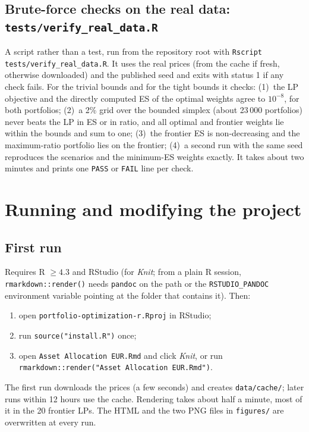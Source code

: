 \documentclass[11pt,a4paper]{article}
\newcommand{\code}[1]{\texttt{#1}}
\newcommand{\file}[1]{\texttt{#1}}
\theoremstyle{plain}
\theoremstyle{remark}
\begin{document}
\subsection{Brute-force checks on the real data: \file{tests/verify\_real\_data.R}}

A script rather than a test, run from the repository root with
\code{Rscript tests/verify\_real\_data.R}. It uses the real prices (from the
cache if fresh, otherwise downloaded) and the published seed and exits with status 1 if any check fails. For the
trivial bounds and for the tight bounds it checks: (1)~the LP objective and
the directly computed ES of the optimal weights agree to $10^{-8}$, for both
portfolios; (2)~a 2\% grid over the bounded simplex (about 23\,000
portfolios) never beats the LP in ES or in ratio, and all optimal and
frontier weights lie within the bounds and sum to one; (3)~the frontier ES
is non-decreasing and the maximum-ratio portfolio lies on the frontier;
(4)~a second run with the same seed reproduces the scenarios and the
minimum-ES weights exactly. It takes about two minutes and prints one \code{PASS} or
\code{FAIL} line per check.

\section{Running and modifying the project}
\label{sec:running}

\subsection{First run}

Requires R $\ge 4.3$ and RStudio (for \emph{Knit}; from a plain R session,
\code{rmarkdown::render()} needs \code{pandoc} on the path or the
\code{RSTUDIO\_PANDOC} environment variable pointing at the folder that
contains it). Then:
\begin{enumerate}[nosep]
  \item open \file{portfolio-optimization-r.Rproj} in RStudio;
  \item run \code{source("install.R")} once;
  \item open \file{Asset Allocation EUR.Rmd} and click \emph{Knit}, or run
        \code{rmarkdown::render("Asset Allocation EUR.Rmd")}.
\end{enumerate}
The first run downloads the prices (a few seconds) and creates
\file{data/cache/}; later runs within 12 hours use the cache. Rendering
takes about half a minute, most of it in the 20 frontier LPs. The HTML and the two PNG files in \file{figures/} are
overwritten at every run.
\end{document}
